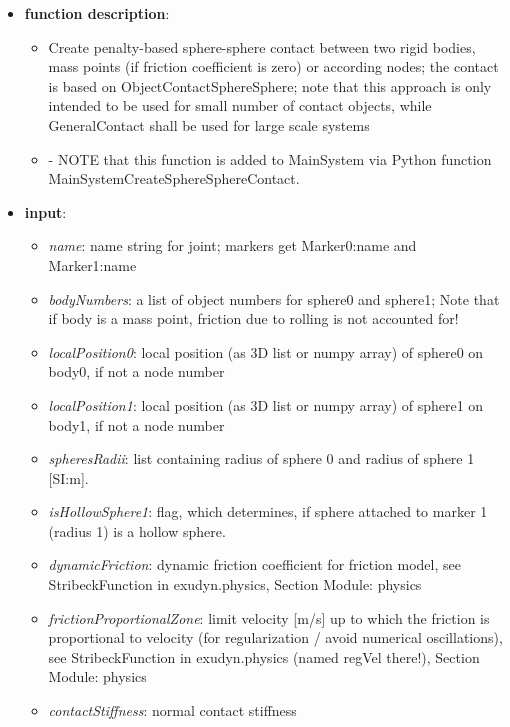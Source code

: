 \begin{itemize}[leftmargin=0.7cm]
\item[--]
{\bf function description}: \vspace{-6pt}
\begin{itemize}[leftmargin=1.2cm]
\setlength{\itemindent}{-0.7cm}
\item[]Create penalty-based sphere-sphere contact between two rigid bodies, mass points (if friction coefficient is zero) or according nodes; the contact is based on ObjectContactSphereSphere; note that this approach is only intended to be used for small number of contact objects, while GeneralContact shall be used for large scale systems
\item[]- NOTE that this function is added to MainSystem via Python function MainSystemCreateSphereSphereContact.
\end{itemize}
\item[--]
{\bf input}: \vspace{-6pt}
\begin{itemize}[leftmargin=1.2cm]
\setlength{\itemindent}{-0.7cm}
\item[]{\it name}: name string for joint; markers get Marker0:name and Marker1:name
\item[]{\it bodyNumbers}: a list of object numbers for sphere0 and sphere1; Note that if body is a mass point, friction due to rolling is not accounted for!
\item[]{\it localPosition0}: local position (as 3D list or numpy array) of sphere0 on body0, if not a node number
\item[]{\it localPosition1}: local position (as 3D list or numpy array) of sphere1 on body1, if not a node number
\item[]{\it spheresRadii}: list containing radius of sphere 0 and radius of sphere 1 [SI:m].
\item[]{\it isHollowSphere1}: flag, which determines, if sphere attached to marker 1 (radius 1) is a hollow sphere.
\item[]{\it dynamicFriction}: dynamic friction coefficient for friction model, see StribeckFunction in exudyn.physics, Section Module: physics
\item[]{\it frictionProportionalZone}: limit velocity [m/s] up to which the friction is proportional to velocity (for regularization / avoid numerical oscillations), see StribeckFunction in exudyn.physics (named regVel there!), Section Module: physics
\item[]{\it contactStiffness}: normal contact stiffness

\end{itemize}
\end{itemize}
